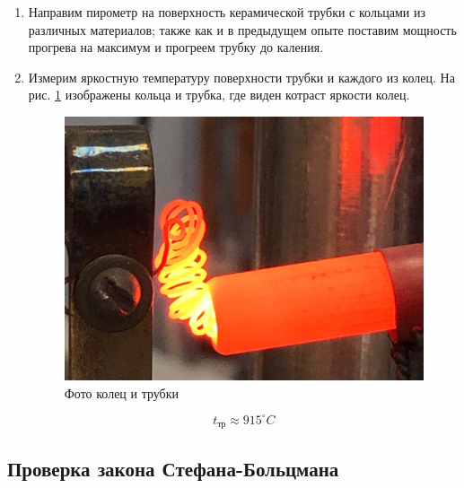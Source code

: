 \documentclass[a4paper]{article}
\begin{document}
\begin{enumerate}
    \item Направим пирометр на поверхность керамической трубки с кольцами из различных материалов;
    также как и в предыдущем опыте поставим мощность прогрева на максимум и прогреем трубку до каления.

    \item Измерим яркостную температуру поверхности трубки и каждого из колец. На рис. \ref{rings} изображены кольца и трубка,
    где виден котраст яркости колец.
    \begin{figure}[H]
        \begin{center}
        \includegraphics[scale = 0.1]{rings.jpg}
        \caption{Фото колец и трубки}
        \label{rings}
        \end{center}
    \end{figure}
    $$t_{тр} \approx 915 ^{\circ} C$$

\end{enumerate}



\subsection{Проверка закона Стефана-Больцмана}
\end{document}
